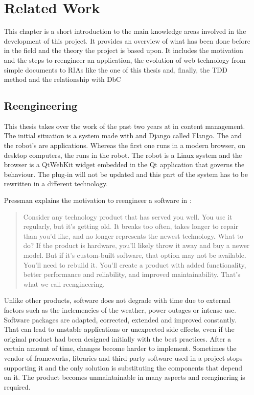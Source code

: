\chapter{Related Work}
This chapter is a short introduction to the main knowledge areas involved in the development of this project.
It provides an overview of what has been done before in the field and the theory the project is based upon.
It includes the motivation and the steps to reengineer an application, the evolution of web technology from simple documents to \acp{RIA} like the one of this thesis and, finally, the \ac{TDD} method and the relationship with \ac{DbC}

\section{Reengineering}
\label{sec:reengineering}
This thesis takes over the work of the past two years at \company in content management.
The initial situation is a system made with \flash and Django called Flango.
The \se and the robot's \cm are \flash applications.
Whereas the first one runs in a modern browser, on desktop computers, the \cm runs in the robot.
The robot is a Linux system and the browser is a QtWebKit widget embedded in the Qt application that governs the behaviour.
The \flash plug-in will not be updated and this part of the system has to be rewritten in a different technology.

Pressman explains the motivation to reengineer a software in \cite{Pressman:2007}:
\begin{quote} 
Consider any technology product that has served you well. 
You use it regularly, but it's getting old. 
It breaks too often, takes longer to repair than you'd like, and no longer represents the newest technology.
What to do? If the product is hardware, you'll likely throw it away and buy a newer model.
But if it's custom-built software, that option may not be available. 
You'll need to rebuild it. 
You'll create a product with added functionality, better performance and reliability, and improved maintainability.
That's what we call reengineering. 
\end{quote}

Unlike other products, software does not degrade with time due to external factors such as the inclemencies of the weather, power outages or intense use.
Software packages are adapted, corrected, extended and improved constantly.
That can lead to unstable applications or unexpected side effects, even if the original product had been designed initially with the best practices.
After a certain amount of time, changes become harder to implement. %
Sometimes the vendor of frameworks, libraries and third-party software used in a project stops supporting it and the only solution is substituting the components that depend on it. 
The product becomes unmaintainable in many aspects and reenginering is required. 


